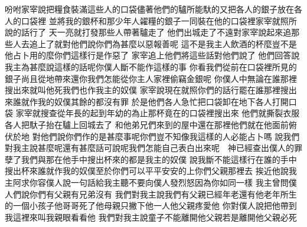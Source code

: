 \bchapter%
吩咐家宰說\chientien 把糧食裝滿這些人的口袋\chientien 儘著他們的驢所能馱的\chientien 又把各人的銀子放在各人的口袋裡\chuan 
{}並將我的銀杯\chientien 和那少年人糴糧的銀子\chientien 一同裝在他的口袋裡\yuentien 家宰就照所說的話行了\chuan 
{}天一亮就打發那些人帶著驢走了\chuan 
{}他們出城走了不遠\chientien{}對家宰說\chientien 起來追那些人去\chientien 追上了就對他們說\chientien 你們為甚麼以惡報善呢\chuan 
{}這不是我主人飲酒的杯麼\chientien 豈不是他占卜用的麼\chientien 你們這樣行是作惡了\chuan 
{}家宰追上他們\chientien 將這些話對他們說了\chuan 
{}他們回答說\chientien 我主為甚麼說這樣的話呢\chientien 你僕人斷不能作這樣的事\chuan 
{}你看\chientien 我們從前在口袋裡所見的銀子\chientien 尚且從地帶來還你\chientien 我們怎能從你主人家裡偷竊金銀呢\chuan 
{}你僕人中\chientien 無論在誰那裡搜出來\chientien 就叫他死\chientien 我們也作我主的奴僕\chuan 
{}家宰說\chientien 現在就照你們的話行罷\chientien 在誰那裡搜出來\chientien 誰就作我的奴僕\yuentien 其餘的都沒有罪\chuan 
{}於是他們各人急忙把口袋卸在地下\chientien 各人打開口袋\chuan 
{}家宰就搜查\chientien 從年長的起\chientien 到年幼的為止\chientien 那杯竟在的口袋裡搜出來\chuan 
{}他們就撕裂衣服\chientien 各人把馱子抬在驢上\chientien 回城去了\chuan\Chuan
{}和他弟兄們來到的屋中\chientien{}還在那裡\chientien 他們就在他面前俯伏於地\chuan 
{}對他們說\chientien 你們作的是甚麼事呢\chientien 你們豈不知像我這樣的人必能占卜嗎\chuan 
{}說\chientien 我們對我主說甚麼呢\yuentien 還有甚麼話可說呢\yuentien 我們怎能自己表白出來呢\yuentien 　神已經查出僕人的罪孽了\yuentien 我們與那在他手中搜出杯來的都是我主的奴僕\chuan 
{}說\chientien 我斷不能這樣行\chientien 在誰的手中搜出杯來\chientien 誰就作我的奴僕\yuentien 至於你們可以平平安安的上你們父親那裡去\chuan\Chuan
{}挨近他說\chientien 我主阿\chientien 求你容僕人說一句話給我主聽\chientien 不要向僕人發烈怒\chientien 因為你如同一樣\chuan 
{}我主曾問僕人們說\chientien 你們有父親有兄弟沒有\chuan 
{}我們對我主說\chientien 我們有父親\chientien 已經年老\chientien 還有他老年所生的一個小孩子\chientien 他哥哥死了\chientien 他母親只撇下他一人\chientien 他父親疼愛他\chuan 
{}你對僕人說\chientien 把他帶到我這裡來\chientien 叫我親眼看看他\chuan 
{}我們對我主說\chientien 童子不能離開他父親\chientien 若是離開\chientien 他父親必死\chuan 

